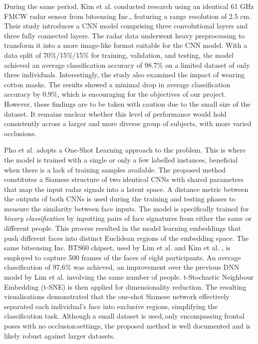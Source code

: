 \documentclass{mpaper}
\begin{document}
During the same period, Kim et al. \cite{kim2020face} conducted research using an identical 61 GHz FMCW radar sensor from bitsensing Inc., featuring a range resolution of 2.5 cm. Their study introduces a CNN model comprising three convolutional layers and three fully connected layers. The radar data underwent heavy preprocessing to transform it into a more image-like format suitable for the CNN model. With a data split of 70\%/15\%/15\% for training, validation, and testing, the model achieved an average classification accuracy of 98.7\% on a limited dataset of only three individuals. Interestingly, the study also examined the impact of wearing cotton masks. The results showed a minimal drop in average classification accuracy by 0.9\%, which is encouraging for the objectives of our project. However, these findings are to be taken with caution due to the small size of the dataset. It remains unclear whether this level of performance would hold consistently across a larger and more diverse group of subjects, with more varied occlusions.

Pho et al. \cite{pho2021radar} adopts a One-Shot Learning approach to the problem. This is where the model is trained with a single or only a few labelled instances, beneficial when there is a lack of training samples available. The proposed method constitutes a Siamese structure of two identical CNNs with shared parameters that map the input radar signals into a latent space. A distance metric between the outputs of both CNNs is used during the training and testing phases to measure the similarity between face inputs. The model is specifically trained for \textit{binary classification} by inputting pairs of face signatures from either the same or different people. This process resulted in the model learning embeddings that push different faces into distinct Euclidean regions of the embedding space. The same bitsensing Inc. BTS60 chipset, used by Lim et al. and Kim et al. \cite{lim2020dnn, kim2020face}, is employed to capture 500 frames of the faces of eight participants. An average classification of 97.6\% was achieved, an improvement over the previous DNN model by Lim et al. involving the same number of people. t-Stochastic Neighbour Embedding (t-SNE) \cite{van2008visualizing} is then applied for dimensionality reduction. The resulting visualisations demonstrated that the one-shot Siamese network effectively separated each individual's face into exclusive regions, simplifying the classification task. Although a small dataset is used,\,only encompassing frontal poses with no occlusion\,settings, the proposed method is well documented and is likely robust against larger datasets.
\end{document}
